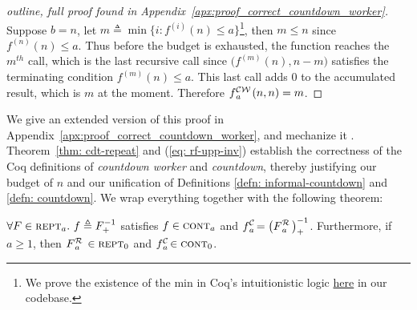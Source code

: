 \begin{proof}[outline, full proof found in Appendix~\ref{apx:proof_correct_countdown_worker}]
	Suppose $b = n$, let $m \triangleq \min\big\{i : f^{(i)}(n)\le a\big\}$\footnote{We prove the existence 
		of the min in Coq’s intuitionistic logic \href{https://github.com/inv-ack/inv-ack/blob/6099297c6ab0e16d14b037fb5ed600c4d22818f6/countdown.v\#L125-L150}{here} in our codebase.}, then $m \le n$ since $f^{(n)}(n)\le a$. Thus before the budget is exhausted, the function reaches the $m^{th}$ call, which is the last recursive call since $\big(f^{(m)}(n), n - m\big)$ satisfies the terminating condition $f^{(m)}(n)\le a$. This last call adds $0$ to the accumulated result, which is $m$ at the moment. Therefore $\cdw{f}{a}(n, n) = m$.
\end{proof}
We give an extended version of this proof in 
Appendix~\ref{apx:proof_correct_countdown_worker}, 
and mechanize it .
Theorem~\ref{thm: cdt-repeat} and (\ref{eq: rf-upp-inv}) establish the correctness of the Coq definitions of \emph{countdown worker} and \emph{countdown}, thereby justifying our budget of $n$ and our unification of 
Definitions \ref{defn: informal-countdown} and \ref{defn: countdown}. We wrap everything together with the following theorem:
\begin{thm} \label{thm: cdt-inv-rf}
	$\forall F\in \text{\scshape{rept}}_a.~f\triangleq F^{-1}_+$ satisfies $f \in \text{\scshape{cont}}_{a}$ and $\displaystyle \cdt{f}{a} \ = \left(\rf{F}{a}\ \right)^{-1}_+$. Furthermore, if $a\ge 1$, then $\rf{F}{a}\ \in \repeatable_0$ and $\cdt{f}{a}\ \in \contract_0$.
\end{thm}
